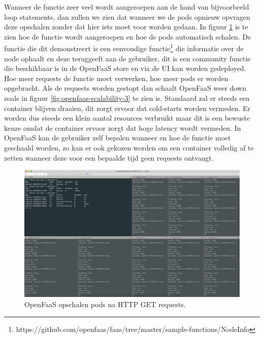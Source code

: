 Wanneer de functie zeer veel wordt aangeroepen aan de hand van bijvoorbeeld loop statements, dan zullen we zien dat wanneer we de pods opnieuw opvragen deze opschalen zonder dat hier iets moet voor worden gedaan. In figuur \ref{fig:openfaas-scalability-2} is te zien hoe de functie wordt aangeroepen en hoe de pods automatisch schalen. De functie die dit demonstreert is een eenvoudige functie\footnote{https://github.com/openfaas/faas/tree/master/sample-functions/NodeInfo} die informatie over de node ophaalt en deze teruggeeft aan de gebruiker, dit is een community functie die beschikbaar is in de OpenFaaS store en via de UI kan worden gedeployed. Hoe meer requests de functie moet verwerken, hoe meer pods er worden opgebracht. Als de requests worden gestopt dan schaalt OpenFaaS weer down zoals in figuur \ref{fig:openfaas-scalability-3} te zien is. Standaard zal er steeds een container blijven draaien, dit zorgt ervoor dat cold-starts worden vermeden. Er worden dus steeds een klein aantal resources verbruikt maar dit is een bewuste keuze omdat de container ervoor zorgt dat hoge latency wordt vermeden. In OpenFaaS kan de gebruiker zelf bepalen wanneer en hoe de functie moet geschaald worden, zo kan er ook gekozen worden om een container volledig af te zetten wanneer deze voor een bepaalde tijd geen requests ontvangt.

\begin{figure}
    \includegraphics[width=1\textwidth]{img/openfaas-scalability-2.png}
    \caption{OpenFaaS opschalen pods na HTTP GET requests.}
    \label{fig:openfaas-scalability-2}  
\end{figure}

